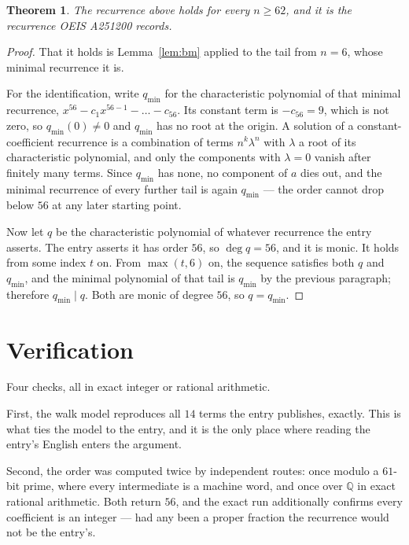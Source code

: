 \documentclass[11pt,a4paper]{article}
\theoremstyle{plain}
\newtheorem{theorem}{Theorem}
\theoremstyle{definition}
\begin{document}
\begin{theorem}
The recurrence above holds for every $n\ge62$, and it is the recurrence OEIS A251200 records.
\end{theorem}

\begin{proof}
That it holds is Lemma~\ref{lem:bm} applied to the tail from $n=6$, whose minimal
recurrence it is.

For the identification, write $q_{\min}$ for the characteristic polynomial of that minimal
recurrence, $x^{56}-c_1x^{56-1}-\dots-c_{56}$. Its constant term is
$-c_{56}=9$, which is not zero, so $q_{\min}(0)\neq0$ and $q_{\min}$ has no
root at the origin. A solution of a constant-coefficient recurrence is a combination of terms
$n^{k}\lambda^{n}$ with $\lambda$ a root of its characteristic polynomial, and only the
components with $\lambda=0$ vanish after finitely many terms. Since $q_{\min}$ has none, no
component of $a$ dies out, and the minimal recurrence of every further tail is again
$q_{\min}$ --- the order cannot drop below $56$ at any later starting point.

Now let $q$ be the characteristic polynomial of whatever recurrence the entry asserts. The
entry asserts it has order $56$, so $\deg q=56$, and it is monic. It holds from some
index $t$ on. From $\max(t,6)$ on, the sequence satisfies both $q$ and $q_{\min}$, and
the minimal polynomial of that tail is $q_{\min}$ by the previous paragraph; therefore
$q_{\min}\mid q$. Both are monic of degree $56$, so $q=q_{\min}$.
\end{proof}

\section{Verification}

Four checks, all in exact integer or rational arithmetic.

First, the walk model reproduces all $14$ terms the entry publishes, exactly. This is
what ties the model to the entry, and it is the only place where reading the entry's English
enters the argument.

Second, the order was computed twice by independent routes: once modulo a $61$-bit prime, where
every intermediate is a machine word, and once over $\mathbb{Q}$ in exact rational arithmetic.
Both return $56$, and the exact run additionally confirms every coefficient is an integer
--- had any been a proper fraction the recurrence would not be the entry's.
\end{document}
